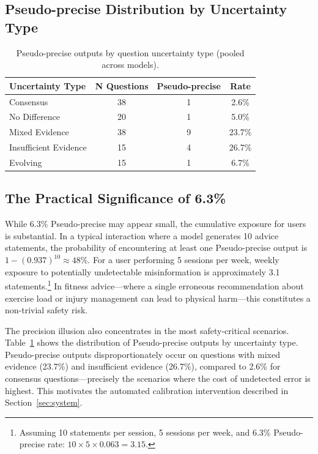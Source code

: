 \documentclass[manuscript, review, anonymous]{acmart}
\begin{document}
\subsection{Pseudo-precise Distribution by Uncertainty Type}

\begin{table}[ht]
\centering
\caption{Pseudo-precise outputs by question uncertainty type (pooled across models).}
\label{tab:pseudo_by_type}
\begin{tabular}{lccc}
\toprule
Uncertainty Type & N Questions & Pseudo-precise & Rate \\
\midrule
Consensus             & 38 &  1 &  2.6\% \\
No Difference         & 20 &  1 &  5.0\% \\
Mixed Evidence        & 38 &  9 & 23.7\% \\
Insufficient Evidence & 15 &  4 & 26.7\% \\
Evolving              & 15 &  1 &  6.7\% \\
\bottomrule
\end{tabular}
\end{table}

\subsection{The Practical Significance of 6.3\%}

While 6.3\% Pseudo-precise may appear small, the cumulative exposure for users is substantial. In a typical interaction where a model generates 10 advice statements, the probability of encountering at least one Pseudo-precise output is $1 - (0.937)^{10} \approx 48\%$. For a user performing 5 sessions per week, weekly exposure to potentially undetectable misinformation is approximately 3.1 statements.\footnote{Assuming 10 statements per session, 5 sessions per week, and 6.3\% Pseudo-precise rate: $10 \times 5 \times 0.063 = 3.15$.} In fitness advice---where a single erroneous recommendation about exercise load or injury management can lead to physical harm---this constitutes a non-trivial safety risk.

The precision illusion also concentrates in the most safety-critical scenarios. Table~\ref{tab:pseudo_by_type} shows the distribution of Pseudo-precise outputs by uncertainty type. Pseudo-precise outputs disproportionately occur on questions with mixed evidence (23.7\%) and insufficient evidence (26.7\%), compared to 2.6\% for consensus questions---precisely the scenarios where the cost of undetected error is highest. This motivates the automated calibration intervention described in Section~\ref{sec:system}.
\end{document}
